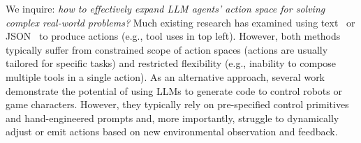 We inquire: \textit{how to effectively expand LLM agents' action space for solving complex real-world problems?} 
Much existing research has examined using text~ or JSON~ to produce actions (e.g., tool uses in  top left).
% 
However, both methods typically suffer from constrained scope of action spaces (actions are usually tailored for specific tasks) and restricted flexibility (e.g., inability to compose multiple tools in a single action).
% 
As an alternative approach, several work \citep{codeaspolicies2022,progprompt,wang2023voyager} demonstrate the potential of using LLMs to generate code to control robots or game characters.
However, they typically rely on pre-specified control primitives and hand-engineered prompts and, more importantly, struggle to dynamically adjust or emit actions based on new environmental observation and feedback.

